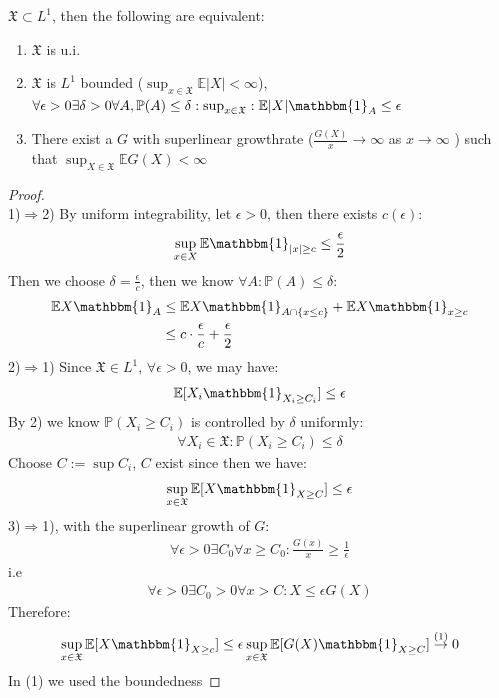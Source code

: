 \begin{theorem}
	$\mathfrak{X} \subset L^1$, then the following are equivalent:
	\begin{enumerate}
		\item $\mathfrak{X}$ is u.i.
		\item $\mathfrak{X}$ is $L^1$ bounded ($\sup_{x \in \mathfrak{X}}\mathbb{E}|X| < \infty$), $\forall \epsilon > 0 \exists \delta > 0\forall A, \mathbb{P}(A) \leq \delta:\sup_{x \in \mathfrak{X}}: \mathbb{E}|X|\mathbbm{1}_A \leq \epsilon$

		\item There exist a $G$ with superlinear growthrate ($\frac{G(X)}{x} \rightarrow \infty$ as $x \rightarrow \infty$ ) such that $\sup_{X \in \mathfrak{X}} \mathbb{E}G(X) < \infty$
	\end{enumerate}
\end{theorem}
\begin{proof}\quad\\
1)$\Rightarrow$2)
	By uniform integrability, let $\epsilon > 0$, then there exists $c(\epsilon)$:
	\begin{align*}
		\sup_{x \in X} \mathbb{E}\mathbbm{1}_{|x| \geq c} \le \frac{\epsilon}{2}
	\end{align*}
	Then we choose $\delta = \frac{\epsilon}{c}$, then we know $\forall A : \mathbb{P}( A) \leq \delta$: 
	\begin{align*}
		\mathbb{E}X\mathbbm{1}_A &\leq \mathbb{E} X \mathbbm{1}_{A \cap \{x \leq c\}} + \mathbb{E}X\mathbbm{1}_{x \geq c}\\
		&\leq c \cdot \frac{\epsilon}{c} +  \frac{\epsilon}{2}
	\end{align*}
	2)$\Rightarrow$1)\label{Q:UI} Since $\mathfrak{X} \in L^1$, $\forall \epsilon >0$, we may have:
	\begin{align*}
		\mathbb{E}[X_i \mathbbm{1}_{X_i \geq C_i}] \leq \epsilon
	\end{align*}
	By 2) we know $\mathbb{P}(X_i \geq C_i)$ is controlled by $\delta$ uniformly:
	\begin{align*}
		\forall X_i \in \mathfrak{X}: \mathbb{P}(X_i \geq C_i) \leq \delta
	\end{align*}
	Choose $C:= \sup C_i$, $C$ exist since then we have:
	\begin{align*}
		\sup_{x \in \mathfrak{X}} \mathbb{E}[X\mathbbm{1}_{X \geq C}] \leq
		 \epsilon
	\end{align*}
	3)$\Rightarrow$1), with the superlinear growth of $G$:
	\begin{align*}
		\forall \epsilon > 0 \exists C_0 \forall x \geq C_0:\frac{G(x)}{x} \geq \frac{1}{\epsilon} 
	\end{align*}
	i.e
	\begin{align*}
		\forall \epsilon > 0 \exists C_0> 0 \forall x > C: X \leq \epsilon G(X)
	\end{align*}
	Therefore:
	\begin{align*}
		\sup_{x \in \mathfrak{X}} \mathbb{E}[X\mathbbm{1}_{X \geq c}] \leq \epsilon \sup_{x \in \mathfrak{X}} \mathbb{E}[G(X)\mathbbm{1}_{X \geq C}] \overset{(1)}{\rightarrow}0
	\end{align*}
	In (1) we used the boundedness
\end{proof}

